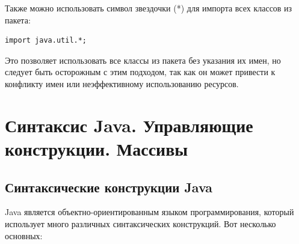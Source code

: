 Также можно использовать символ звездочки (*) для импорта всех классов из пакета:

\begin{lstlisting}
import java.util.*;
\end{lstlisting}

Это позволяет использовать все классы из пакета без указания их имен, но следует быть осторожным с этим подходом, так как он может привести к конфликту имен или неэффективному использованию ресурсов.

\newpage
\chapter{Синтаксис Java. Управляющие конструкции. Массивы}
\section{Синтаксические конструкции Java}

Java является объектно-ориентированным языком программирования, который использует много различных синтаксических конструкций. Вот несколько основных:

